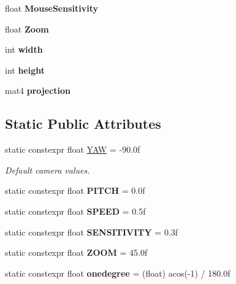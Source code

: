 \begin{DoxyCompactItemize}
\item 
\mbox{\label{classCamera_a73e88844b31d5111eeb76327dfbb2d68}} 
float {\bfseries Mouse\+Sensitivity}
\item 
\mbox{\label{classCamera_a2becf27d08eb7e6da9c597c73ea95b5d}} 
float {\bfseries Zoom}
\item 
\mbox{\label{classCamera_a7f3890bf4c4bd76790569c1c42014e32}} 
int {\bfseries width}
\item 
\mbox{\label{classCamera_a71d4b6a3a1bcd937a9f147a3e35a8fed}} 
int {\bfseries height}
\item 
\mbox{\label{classCamera_a94693ab302c858a511a44a4f34ef64ae}} 
mat4 {\bfseries projection}
\end{DoxyCompactItemize}
\subsection*{Static Public Attributes}
\begin{DoxyCompactItemize}
\item 
\mbox{\label{classCamera_a409bc996200b4781bb35cff69bc700ae}} 
static constexpr float \hyperlink{classCamera_a409bc996200b4781bb35cff69bc700ae}{Y\+AW} = -\/90.\+0f
\begin{DoxyCompactList}\small\item\em Default camera values. \end{DoxyCompactList}\item 
\mbox{\label{classCamera_a1a3c7b1d1fe585faf2224ccd6c2614e3}} 
static constexpr float {\bfseries P\+I\+T\+CH} = 0.\+0f
\item 
\mbox{\label{classCamera_af80c8fa98a4f3261080ed80527ba7f80}} 
static constexpr float {\bfseries S\+P\+E\+ED} = 0.\+5f
\item 
\mbox{\label{classCamera_a06474967f88b6cd3023a5c6fe4c49601}} 
static constexpr float {\bfseries S\+E\+N\+S\+I\+T\+I\+V\+I\+TY} = 0.\+3f
\item 
\mbox{\label{classCamera_a27bbb30d1b08f4e2d3c4342b60487301}} 
static constexpr float {\bfseries Z\+O\+OM} = 45.\+0f
\item 
\mbox{\label{classCamera_a2020859c32befc6e4261240b15ff7b33}} 
static constexpr float {\bfseries onedegree} = (float) acos(-\/1) / 180.\+0f
\end{DoxyCompactItemize}


